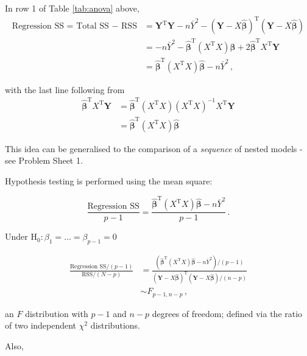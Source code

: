 \documentclass[
]{book}
\theoremstyle{definition}
\theoremstyle{definition}
\theoremstyle{definition}
\theoremstyle{definition}
\theoremstyle{remark}
\begin{document}
In row 1 of Table \ref{tab:anova} above,
\begin{align}
\textrm{Regression SS = Total SS $-$ RSS} & = \boldsymbol{Y}^{\textrm{T}}\boldsymbol{Y} - n\bar{Y}^{2} - (\boldsymbol{Y}-X\hat{\boldsymbol{\beta}})^{\textrm{T}}(\boldsymbol{Y}-X\hat{\boldsymbol{\beta}})\\
& = -n\bar{Y}^{2}-\hat{\boldsymbol{\beta}}^{\textrm{T}}(X^{\textrm{T}}X)\hat{\boldsymbol{\beta}}+2\hat{\boldsymbol{\beta}}^{\textrm{T}}X^{\textrm{T}}\boldsymbol{Y} \\
& = \hat{\boldsymbol{\beta}}^{\textrm{T}}(X^{\textrm{T}}X)\hat{\boldsymbol{\beta}}-n\bar{Y}^{2}\,,
\label{eq:SSS}
\end{align}

with the last line following from
\begin{align*}
\hat{\boldsymbol{\beta}}^{\textrm{T}}X^{\textrm{T}}\boldsymbol{Y} & =
\hat{\boldsymbol{\beta}}^{\textrm{T}}(X^{\textrm{T}}X)(X^{\textrm{T}}X)^{-1}X^{\textrm{T}}\boldsymbol{Y} \\
& = \hat{\boldsymbol{\beta}}^{\textrm{T}}(X^{\textrm{T}}X)\hat{\boldsymbol{\beta}}
\end{align*}

This idea can be generalised to the comparison of a \emph{sequence} of nested models - see Problem Sheet 1.

Hypothesis testing is performed using the mean square:

\begin{equation}
\frac{\textrm{Regression SS}}{p-1}=\frac{\hat{\boldsymbol{\beta}}^{\textrm{T}}(X^{\textrm{T}}X)\hat{\boldsymbol{\beta}}-n\bar{Y}^{2}}{p-1}\,.\nonumber
\end{equation}

Under \(\textrm{H}_{0}: \beta_{1}=\dots=\beta_{p-1}=0\)

\begin{align*}
\frac{\textrm{Regression SS}/(p-1)}{\textrm{RSS}/(N-p)} & = \frac{(\hat{\boldsymbol{\beta}}^{\textrm{T}}(X^{\textrm{T}}X)\hat{\boldsymbol{\beta}} - n\bar{Y}^{2})/(p-1)}{(\boldsymbol{Y}-X\hat{\boldsymbol{\beta}})^{\textrm{T}}(\boldsymbol{Y}-X\hat{\boldsymbol{\beta}})/(n-p)}\nonumber\\
& \sim F_{p-1,n-p}\,,
\end{align*}

an \(F\) distribution with \(p-1\) and \(n-p\) degrees of freedom; defined via the ratio of two independent \(\chi^{2}\) distributions.

Also,
\end{document}
